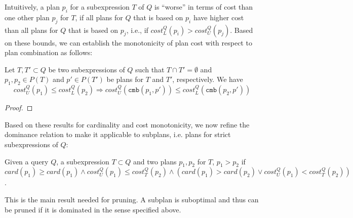 Intuitively, a plan $p_i$ for a subexpression $T$ of $Q$ is ``worse''
in terms of cost than one other plan $p_j$ for $T$, if all plans for
$Q$ that is based on $p_i$ have higher cost than all plans for $Q$ that
is based on $p_j$, i.e., if $cost_L^Q(p_i) > cost_U^Q(p_j)$. Based on these bounds, we can establish the monotonicity of plan cost with respect to plan combination as follows:
  
\begin{lemma}
  Let $T,T' \subset Q$ be two subexpressions of
  $Q$ such that $T \cap T' = \emptyset$ and $p_1,p_2 \in P(T)$ and
  $p' \in P(T')$ be plans for $T$ and $T'$, respectively. We have 
    \[ cost^Q_U(p_1) \leq cost^Q_L(p_2) \Rightarrow
    cost^Q_U(\mathtt{cmb}(p_1,p')) \leq
    cost^Q_L(\mathtt{cmb}(p_2,p')) \]
\end{lemma}
\begin{proof}
  
\end{proof}

Based on these results for cardinality and cost monotonicity, we now refine the dominance relation to make it applicable to subplans, i.e. plans for strict subexpressions of $Q$: 

\begin{theorem}
  \label{def:dominates_bound}
  Given a query $Q$, a subexpression $T \subset Q$ and two plans
  $p_1,p_2$ for $T$, $p_1 > p_2$ if
  $card(p_1) \geq card(p_1) \wedge cost_U^Q(p_1) \leq cost_T^Q(p_2)
  \wedge (card(p_1) > card(p_2) \vee cost_U^Q(p_1) < cost_T^Q(p_2))$.
\end{theorem}

This is the main result needed for pruning. A subplan is suboptimal and thus can be pruned if it is dominated in the sense specified above. 




